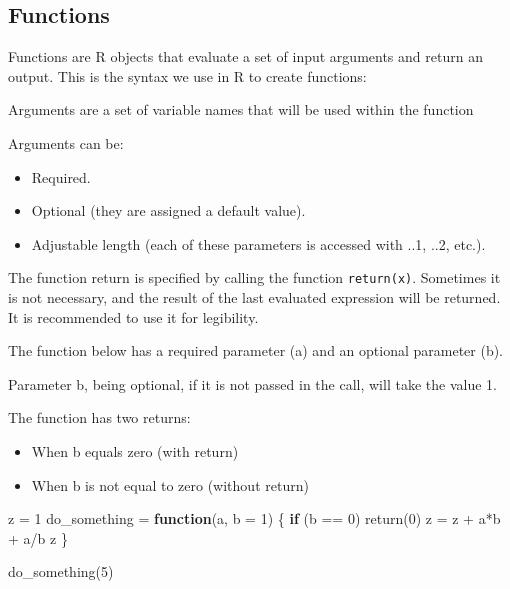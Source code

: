 \documentclass[
]{book}
\newenvironment{Shaded}{\begin{snugshade}}{\end{snugshade}}
\newcommand{\AttributeTok}[1]{\textcolor[rgb]{0.77,0.63,0.00}{#1}}
\newcommand{\ControlFlowTok}[1]{\textcolor[rgb]{0.13,0.29,0.53}{\textbf{#1}}}
\newcommand{\DecValTok}[1]{\textcolor[rgb]{0.00,0.00,0.81}{#1}}
\newcommand{\FunctionTok}[1]{\textcolor[rgb]{0.00,0.00,0.00}{#1}}
\newcommand{\NormalTok}[1]{#1}
\newcommand{\OtherTok}[1]{\textcolor[rgb]{0.56,0.35,0.01}{#1}}
\newcommand{\SpecialCharTok}[1]{\textcolor[rgb]{0.00,0.00,0.00}{#1}}
\providecommand{\tightlist}{%
  \setlength{\itemsep}{0pt}\setlength{\parskip}{0pt}}
\begin{document}
\hypertarget{functions}{%
\subsection{Functions}\label{functions}}

Functions are R objects that evaluate a set of input arguments and return an output. This is the syntax we use in R to create functions:

Arguments are a set of variable names that will be used within the function

Arguments can be:

\begin{itemize}
\tightlist
\item
  Required.
\item
  Optional (they are assigned a default value).
\item
  Adjustable length (each of these parameters is accessed with ..1, ..2, etc.).
\end{itemize}

The function return is specified by calling the function \texttt{return(x)}. Sometimes it is not necessary, and the result of the last evaluated expression will be returned. It is recommended to use it for legibility.

The function below has a required parameter (a) and an optional parameter (b).

Parameter b, being optional, if it is not passed in the call, will take the value 1.

The function has two returns:

\begin{itemize}
\tightlist
\item
  When b equals zero (with return)
\item
  When b is not equal to zero (without return)
\end{itemize}

\begin{Shaded}
\begin{Highlighting}[]
\NormalTok{z }\OtherTok{=} \DecValTok{1}
\NormalTok{do\_something }\OtherTok{=} \ControlFlowTok{function}\NormalTok{(a, }\AttributeTok{b =} \DecValTok{1}\NormalTok{) \{}
    \ControlFlowTok{if}\NormalTok{ (b }\SpecialCharTok{==} \DecValTok{0}\NormalTok{)}
        \FunctionTok{return}\NormalTok{(}\DecValTok{0}\NormalTok{)}
\NormalTok{    z }\OtherTok{=}\NormalTok{ z }\SpecialCharTok{+}\NormalTok{ a}\SpecialCharTok{*}\NormalTok{b }\SpecialCharTok{+}\NormalTok{ a}\SpecialCharTok{/}\NormalTok{b}
\NormalTok{    z}
\NormalTok{\}}

\FunctionTok{do\_something}\NormalTok{(}\DecValTok{5}\NormalTok{)}
\end{Highlighting}
\end{Shaded}
\end{document}
